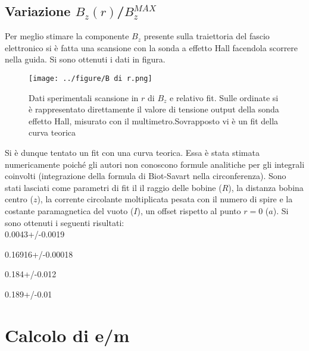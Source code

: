 \documentclass[10pt,a4paper]{article}
\begin{document}
\subsection{Variazione $B_z(r)$/$B_z^{MAX}$}

Per meglio stimare la componente $B_z$ presente sulla traiettoria del fascio elettronico si è fatta una scansione con la sonda a effetto Hall facendola scorrere nella guida. Si sono ottenuti i dati in figura.\\

\begin{figure}[h!]
	\centering
	\texttt{[image: ../figure/B di r.png]}
	\caption{Dati sperimentali scansione in $r$ di $B_z$ e relativo fit. Sulle ordinate si è rappresentato direttamente il valore di tensione output della sonda effetto Hall, misurato con il multimetro.Sovrapposto vi è un fit della curva teorica}
	\label{task6.3}
\end{figure}

Si è dunque tentato un fit con una curva teorica. Essa è stata stimata numericamente poiché gli autori non conoscono formule analitiche per gli integrali coinvolti (integrazione della formula di Biot-Savart nella circonferenza). Sono stati lasciati come parametri di fit il il raggio delle bobine ($R$), la distanza bobina centro ($z$), la corrente circolante moltiplicata pesata con il numero di spire e la costante paramagnetica del vuoto ($I$), un offset rispetto al punto $r=0$ ($a$). Si sono ottenuti i seguenti risultati:\\

0.0043+/-0.0019

0.16916+/-0.00018

0.184+/-0.012

0.189+/-0.01

\section{Calcolo di e/m}


\end{document}
